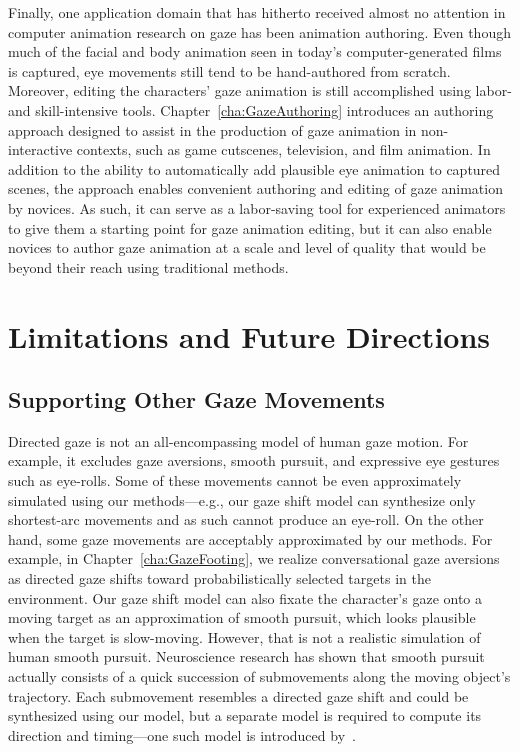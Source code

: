 Finally, one application domain that has hitherto received almost no attention in computer animation research on gaze has been animation authoring. Even though much of the facial and body animation seen in today's computer-generated films is captured, eye movements still tend to be hand-authored from scratch. Moreover, editing the characters' gaze animation is still accomplished using labor- and skill-intensive tools. Chapter~\ref{cha:GazeAuthoring} introduces an authoring approach designed to assist in the production of gaze animation in non-interactive contexts, such as game cutscenes, television, and film animation. In addition to the ability to automatically add plausible eye animation to captured scenes, the approach enables convenient authoring and editing of gaze animation by novices. As such, it can serve as a labor-saving tool for experienced animators to give them a starting point for gaze animation editing, but it can also enable novices to author gaze animation at a scale and level of quality that would be beyond their reach using traditional methods.

\section{Limitations and Future Directions}

\subsection{Supporting Other Gaze Movements}

Directed gaze is not an all-encompassing model of human gaze motion. For example, it excludes gaze aversions, smooth pursuit, and expressive eye gestures such as eye-rolls. Some of these movements cannot be even approximately simulated using our methods---e.g., our gaze shift model can synthesize only shortest-arc movements and as such cannot produce an eye-roll. On the other hand, some gaze movements are acceptably approximated by our methods. For example, in Chapter~\ref{cha:GazeFooting}, we realize conversational gaze aversions as directed gaze shifts toward probabilistically selected targets in the environment. Our gaze shift model can also fixate the character's gaze onto a moving target as an approximation of smooth pursuit, which looks plausible when the target is slow-moving. However, that is not a realistic simulation of human smooth pursuit. Neuroscience research has shown that smooth pursuit actually consists of a quick succession of submovements along the moving object's trajectory. Each submovement resembles a directed gaze shift and could be synthesized using our model, but a separate model is required to compute its direction and timing---one such model is introduced by~\citet{yeo2012eyecatch}.

